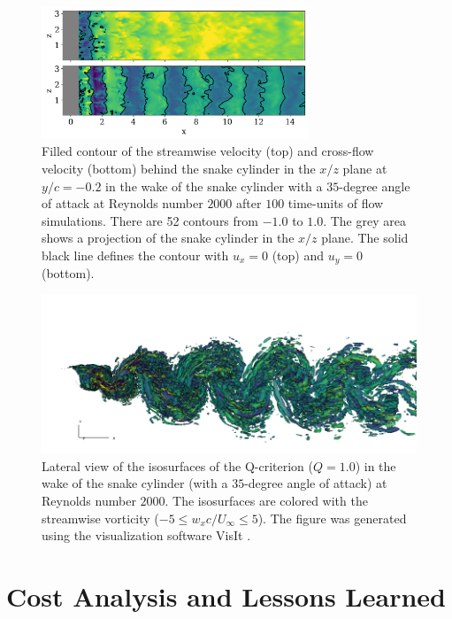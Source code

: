 \documentclass[10pt,journal,compsoc]{IEEEtran}
\begin{document}
\begin{figure}
    \centering
    \includegraphics[width=8cm]{figures/ux_uy_xz_plane.png}
    \caption{Filled contour of the streamwise velocity (top) and cross-flow velocity (bottom) behind the snake cylinder in the $x/z$ plane at $y/c=-0.2$ in the wake of the snake cylinder with a $35$-degree angle of attack at Reynolds number $2000$ after $100$ time-units of flow simulations. There are 52 contours from $-1.0$ to $1.0$. The grey area shows a projection of the snake cylinder in the $x/z$ plane. The solid black line defines the contour with $u_x = 0$ (top) and $u_y = 0$ (bottom).}
    \label{fig:ux_uy_xz_plane_3d}
\end{figure}

\begin{figure}[!h]
    \centering
    \includegraphics[width=18cm]{figures/qcrit_wx_wake3d_0020.png}
    \caption{Lateral view of the isosurfaces of the Q-criterion ($Q = 1.0$) in the wake of the snake cylinder (with a $35$-degree angle of attack) at Reynolds number $2000$. The isosurfaces are colored with the streamwise vorticity ($-5 \leq w_x c / U_\infty \leq 5$). The figure was generated using the visualization software VisIt \cite{childs_et_al_2012}.}
    \label{fig:qcrit_wx_3d}
\end{figure}

\section{Cost Analysis and Lessons Learned}\label{sec:cost}
\end{document}

